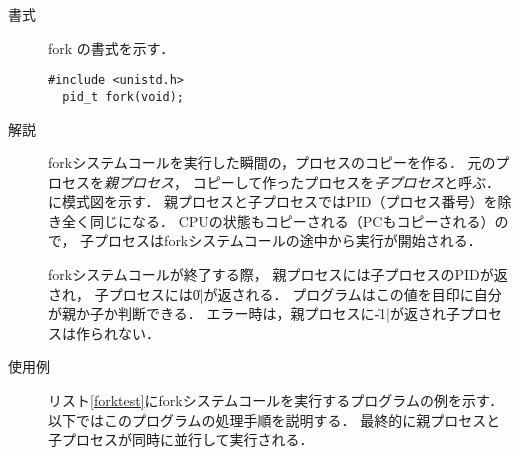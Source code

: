 \begin{description}
\item[書式] fork の書式を示す．
\begin{lstlisting}[numbers=none]
  #include <unistd.h>
  pid_t fork(void);
\end{lstlisting}

\item[解説] forkシステムコールを実行した瞬間の，プロセスのコピーを作る．
  元のプロセスを\emph{親プロセス}，
  コピーして作ったプロセスを\emph{子プロセス}と呼ぶ．
  に模式図を示す．
  親プロセスと子プロセスではPID（プロセス番号）を除き全く同じになる．
  CPUの状態もコピーされる（PCもコピーされる）ので，
  子プロセスはforkシステムコールの途中から実行が開始される．


  forkシステムコールが終了する際，
  親プロセスには子プロセスのPIDが返され，
  子プロセスには\|0|が返される．
  プログラムはこの値を目印に自分が親か子か判断できる．
  エラー時は，親プロセスに\|-1|が返され子プロセスは作られない．

\item[使用例]
  リスト\ref{forktest}にforkシステムコールを実行するプログラムの例を示す．
  以下ではこのプログラムの処理手順を説明する．
  最終的に親プロセスと子プロセスが同時に並行して実行される．

  
  

\end{description}
